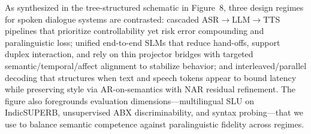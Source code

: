\documentclass{article}
\begin{document}
As synthesized in the tree-structured schematic in Figure~8, three design regimes for spoken dialogue systems are contrasted: cascaded ASR$\rightarrow$LLM$\rightarrow$TTS pipelines that prioritize controllability yet risk error compounding and paralinguistic loss; unified end-to-end SLMs that reduce hand-offs, support duplex interaction, and rely on thin projector bridges with targeted semantic/temporal/affect alignment to stabilize behavior; and interleaved/parallel decoding that structures when text and speech tokens appear to bound latency while preserving style via AR-on-semantics with NAR residual refinement. The figure also foregrounds evaluation dimensions---multilingual SLU on IndicSUPERB, unsupervised ABX discriminability, and syntax probing---that we use to balance semantic competence against paralinguistic fidelity across regimes.
\end{document}
